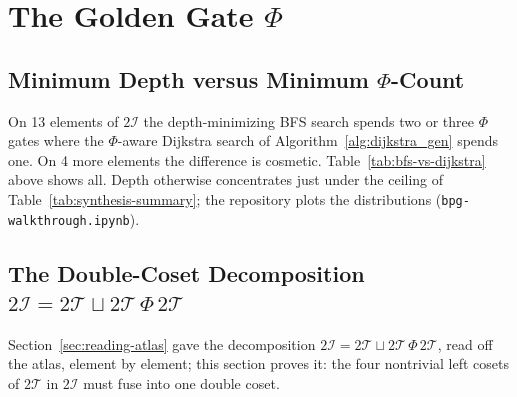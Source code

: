\documentclass[11pt, oneside, openany]{scrbook}
\newcommand{\Tgroup}{\mathcal{T}}  %
\newcommand{\Igroup}{\mathcal{I}}  %
\newcommand{\TwoT}{2\Tgroup}
\newcommand{\TwoI}{2\Igroup}
\begin{document}

\clearpage %



\chapter{The Golden Gate \texorpdfstring{$\Phi$}{Φ}} \label{app:synthesis}

\section{Minimum Depth versus Minimum \texorpdfstring{$\Phi$}{Φ}-Count} \label{sec:synthesis:depth}



On 13 elements of $\TwoI$ the depth-minimizing BFS search spends two or three $\Phi$ gates where the $\Phi$-aware Dijkstra search of Algorithm~\ref{alg:dijkstra_gen} spends one. On 4 more elements the difference is cosmetic. Table~\ref{tab:bfs-vs-dijkstra} above shows all. Depth otherwise concentrates just under the ceiling of Table~\ref{tab:synthesis-summary}; the repository plots the distributions (\texttt{bpg-walkthrough.ipynb}).

\section{The Double-Coset Decomposition \texorpdfstring{$\TwoI = \TwoT \sqcup \TwoT\,\Phi\,\TwoT$}{2I = 2T ⊔ 2TΦ2T}} \label{sec:synthesis:doublecoset}

Section~\ref{sec:reading-atlas} gave the decomposition $\TwoI = \TwoT \sqcup \TwoT\,\Phi\,\TwoT$, read off the atlas, element by element; this section proves it: the four nontrivial left cosets of $\TwoT$ in $\TwoI$ must fuse into one double coset.
\end{document}
